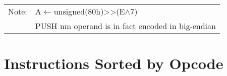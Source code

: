\documentclass[oneside,a4paper]{book}
\newcommand{\notet}{\rule{0pt}{2.4ex}}
\begin{document}
{\begin{tabular}{llcccccccccccccccl}
		\hline

		Note:

			& \multicolumn{17}{l}{\parbox{12cm}{\footnotemark[1] A$\leftarrow$unsigned(80h)>>(E$\wedge$7)}} \\

			& \multicolumn{17}{l}{\parbox{12cm}{\footnotemark[2] PUSH nm operand is in fact encoded in big-endian}}\notet \\

		\hline

	\end{tabular}
}

\stopcontents[intrstructionsections]



\chapter{Instructions Sorted by Opcode}
\end{document}

